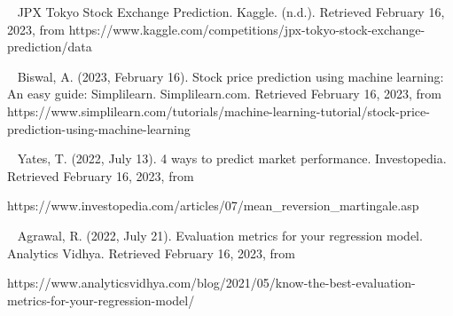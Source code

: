 \documentclass{article}
\begin{document}
~\cite{hegazy2014machine}

~\cite{CHONG2017187}

~\cite{JIANG2021115537}

~\cite{8541310}

~\cite{arXiv:1605.00003}

~\cite{JPX} 
JPX Tokyo Stock Exchange Prediction. Kaggle. (n.d.). Retrieved February 16, 2023, from https://www.kaggle.com/competitions/jpx-tokyo-stock-exchange-prediction/data 

~\cite{Biswal} 
Biswal, A. (2023, February 16). Stock price prediction using machine learning: An easy guide: Simplilearn. Simplilearn.com. Retrieved February 16, 2023, from https://www.simplilearn.com/tutorials/machine-learning-tutorial/stock-price-prediction-using-machine-learning 

~\cite{Yates} 
Yates, T. (2022, July 13). 4 ways to predict market performance. Investopedia. Retrieved February 16, 2023, from 

https://www.investopedia.com/articles/07/mean_reversion_martingale.asp 

~\cite{Agrawal} 
Agrawal, R. (2022, July 21). Evaluation metrics for your regression model. Analytics Vidhya. Retrieved February 16, 2023, from 

https://www.analyticsvidhya.com/blog/2021/05/know-the-best-evaluation-metrics-for-your-regression-model/ 
\end{document}
